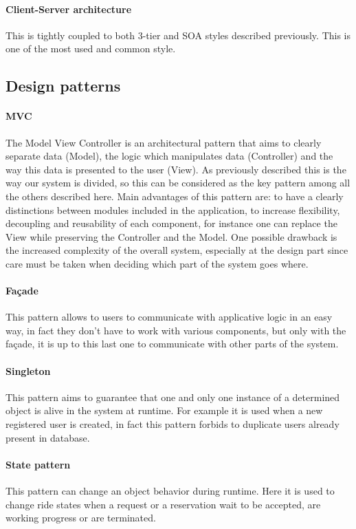 \paragraph{Client-Server architecture}
This is tightly coupled to both 3-tier and SOA styles described previously. This is one of the most used and common style.
\subsection{Design patterns}
\paragraph{MVC}
The Model View Controller is an architectural pattern that aims to clearly separate data (Model), the logic which manipulates data (Controller) and the way this data is presented to the user (View). As previously described this is the way our system is divided, so this can be considered as the key pattern among all the others described here. Main advantages of this pattern are: to have a clearly distinctions between modules included in the application, to increase flexibility, decoupling and reusability of each component, for instance one can replace the View while preserving the Controller and the Model. One possible drawback is the increased complexity of the overall system, especially at the design part since care must be taken when deciding which part of the system goes where.
\paragraph{Fa\c{c}ade}
This pattern allows to users to communicate with applicative logic in an easy way, in fact they don't have to work with various components, but only with the fa\c{c}ade, it is up to this last one to communicate with other parts of the system.
\paragraph{Singleton}
This pattern aims to guarantee that one and only one instance of a determined object is alive in the system at runtime. For example it is used when a new registered user is created, in fact this pattern forbids to duplicate users already present in database. 
\paragraph{State pattern}
This pattern can change an object behavior during runtime. Here it is used to change ride states when a request or a reservation wait to be accepted, are working progress or are terminated.
